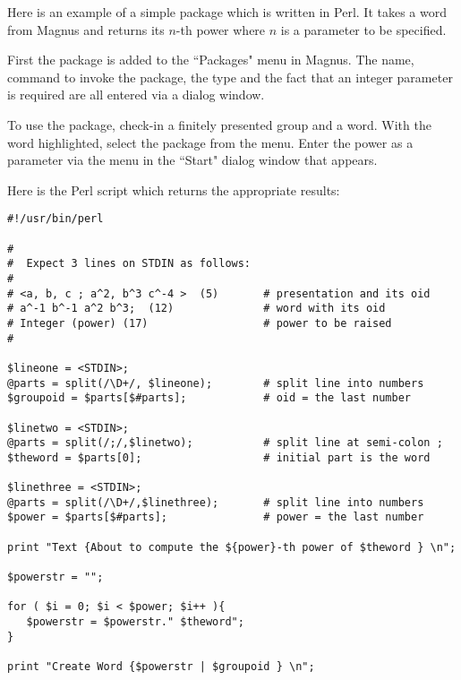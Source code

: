 \documentclass[12pt]{article}
\begin{document}
Here is an example of a simple package which is written in Perl.
It takes a word from Magnus and returns its $n$-th power where
$n$ is a parameter to be specified.

First the package is added to the ``Packages" menu in Magnus. The name,
command to invoke the package, the type and the fact that an integer
parameter is required are all entered via a dialog window.

To use the package, check-in a finitely presented group and a word.
With the word highlighted, select the package from the menu. Enter
the power as a parameter via the menu in the ``Start" dialog window 
that appears.

Here is the Perl script which returns the appropriate results:

\begin{verbatim}
#!/usr/bin/perl

#
#  Expect 3 lines on STDIN as follows:
#
# <a, b, c ; a^2, b^3 c^-4 >  (5)       # presentation and its oid
# a^-1 b^-1 a^2 b^3;  (12)              # word with its oid
# Integer (power) (17)                  # power to be raised
#

$lineone = <STDIN>;
@parts = split(/\D+/, $lineone);        # split line into numbers
$groupoid = $parts[$#parts];            # oid = the last number

$linetwo = <STDIN>;
@parts = split(/;/,$linetwo);           # split line at semi-colon ;
$theword = $parts[0];                   # initial part is the word

$linethree = <STDIN>;
@parts = split(/\D+/,$linethree);       # split line into numbers
$power = $parts[$#parts];               # power = the last number

print "Text {About to compute the ${power}-th power of $theword } \n";

$powerstr = "";

for ( $i = 0; $i < $power; $i++ ){
   $powerstr = $powerstr." $theword";
}

print "Create Word {$powerstr | $groupoid } \n";
\end{verbatim}
\end{document}
